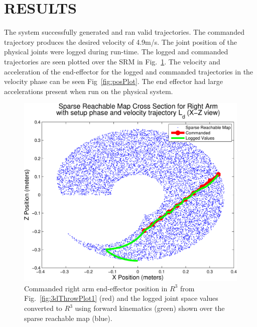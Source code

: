 \section{RESULTS}\label{sec:reslts}
The system successfully generated and ran valid trajectories.  The commanded trajectory produces the desired velocity of 4.9m/s.  The joint position of the physical joints were logged during run-time.  The logged and commanded trajectories are seen plotted over the SRM in Fig.~\ref{fig:svmMap}.  The velocity and acceleration of the end-effector for the logged and commanded trajectories in the velocity phase can be seen Fig~\ref{fig:posPlot}.  The end effector had large accelerations present when run on the physical system.  

\begin{figure}[thpb]
  \centering
\includegraphics[width=1.0\columnwidth]{./MATLAB/throwTrajAct.pdf}
  \caption{Commanded right arm end-effector position in $R^3$ from Fig.~\ref{fig:3dThrowPlot1} (red) and the logged joint space values converted to $R^3$ using forward kinematics (green) shown over the sparse reachable map (blue).}
  \label{fig:svmMap}
\end{figure}

